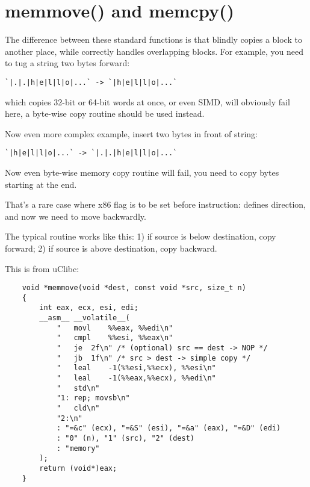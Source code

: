 \section{memmove() and memcpy()}
\label{memmove_and_DF}

The difference between these standard functions is that  blindly copies a block to another place,
while  correctly handles overlapping blocks.
For example, you need to tug a string two bytes forward:

\begin{lstlisting}
`|.|.|h|e|l|l|o|...` -> `|h|e|l|l|o|...`
\end{lstlisting}

 which copies 32-bit or 64-bit words at once, or even \ac{SIMD},
will obviously fail here, a byte-wise copy routine should be used instead.

Now even more complex example, insert two bytes in front of string:

\begin{lstlisting}
`|h|e|l|l|o|...` -> `|.|.|h|e|l|l|o|...`
\end{lstlisting}

Now even byte-wise memory copy routine will fail, you need to copy bytes starting at the end.

That's a rare case where  x86 flag is to be set before  instruction:
 defines direction, and now we need to move backwardly.

The typical  routine works like this:
1) if source is below destination, copy forward;
2) if source is above destination, copy backward.

This is  from uClibc:

\begin{lstlisting}
	void *memmove(void *dest, const void *src, size_t n)
	{
		int eax, ecx, esi, edi;
		__asm__ __volatile__(
			"	movl	%%eax, %%edi\n"
			"	cmpl	%%esi, %%eax\n"
			"	je	2f\n" /* (optional) src == dest -> NOP */
			"	jb	1f\n" /* src > dest -> simple copy */
			"	leal	-1(%%esi,%%ecx), %%esi\n"
			"	leal	-1(%%eax,%%ecx), %%edi\n"
			"	std\n"
			"1:	rep; movsb\n"
			"	cld\n"
			"2:\n"
			: "=&c" (ecx), "=&S" (esi), "=&a" (eax), "=&D" (edi)
			: "0" (n), "1" (src), "2" (dest)
			: "memory"
		);
		return (void*)eax;
	}
\end{lstlisting}

